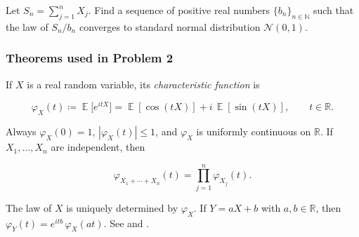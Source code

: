 \documentclass[11pt,a4paper]{article}
\DeclareMathOperator{\E}{\mathbb{E}}
\begin{document}
Let \( S_n = \sum_{j=1}^n X_j \). Find a sequence of positive real numbers \( \{b_n\}_{n \in \mathbb{N}} \) such that the law of \( S_n / b_n \) converges to standard normal distribution \( \mathcal{N}(0, 1) \).

\setcounter{section}{2}
\setcounter{definition}{0}

\subsubsection{Theorems used in Problem 2}

\begin{definition}
\label{def:chf}
If \(X\) is a real random variable, its \emph{characteristic function} is

\[
\varphi_{X}(t)
\coloneqq
\E\bigl[e^{itX}\bigr]
=
\E[\cos(tX)] + i\,\E[\sin(tX)],
\qquad
t \in \mathbb{R}.
\]

Always \(\varphi_{X}(0) = 1\), \(|\varphi_{X}(t)| \le 1\), and \(\varphi_{X}\) is uniformly continuous on \(\mathbb{R}\). If \(X_{1}, \dots, X_{n}\) are independent, then

\[
\varphi_{X_{1}+\cdots+X_{n}}(t)
=
\prod_{j=1}^{n} \varphi_{X_{j}}(t).
\]

The law of \(X\) is uniquely determined by \(\varphi_{X}\). If \(Y = aX + b\) with \(a, b \in \mathbb{R}\), then \(\varphi_{Y}(t) = e^{itb}\,\varphi_{X}(at)\). See \citep[Theorems~3.3.1 and~3.3.2]{durrett2010} and \citep[Chapter~6]{chung1968}.
\end{definition}
\end{document}
